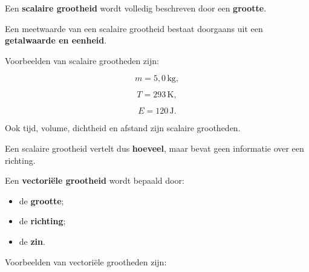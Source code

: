 \documentclass{ximera}
\begin{document}



\begin{definitie}

Een \textbf{scalaire grootheid} wordt volledig beschreven door een
\textbf{grootte}.

Een meetwaarde van een scalaire grootheid bestaat doorgaans uit een
\textbf{getalwaarde en eenheid}.

\end{definitie}


\begin{voorbeeld}

Voorbeelden van scalaire grootheden zijn:

\[
m = 5{,}0\,\si{\kilogram},
\]

\[
T = 293\,\si{\kelvin},
\]

\[
E = 120\,\si{\joule}.
\]

Ook tijd, volume, dichtheid en afstand zijn scalaire grootheden.

\end{voorbeeld}


Een scalaire grootheid vertelt dus \textbf{hoeveel}, maar bevat geen
informatie over een richting.




\begin{definitie}

Een \textbf{vectoriële grootheid} wordt bepaald door:

\begin{itemize}
    \item de \textbf{grootte};
    \item de \textbf{richting};
    \item de \textbf{zin}.
\end{itemize}

\end{definitie}


Voorbeelden van vectoriële grootheden zijn:
\end{document}
